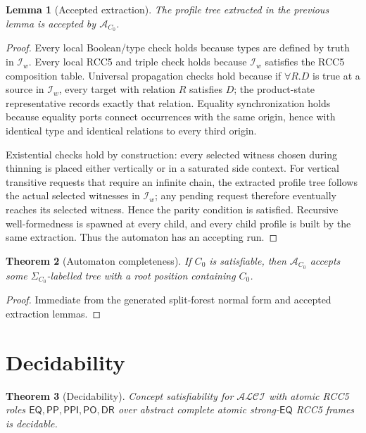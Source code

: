 \documentclass[11pt]{article}
\newtheorem{theorem}{Theorem}[section]
\newtheorem{lemma}[theorem]{Lemma}
\newcommand{\ALCI}{\mathcal{ALCI}}
\newcommand{\EQ}{\mathsf{EQ}}
\newcommand{\PP}{\mathsf{PP}}
\newcommand{\PPI}{\mathsf{PPI}}
\newcommand{\PO}{\mathsf{PO}}
\newcommand{\DR}{\mathsf{DR}}
\newcommand{\Aut}{\mathcal A}
\begin{document}
\begin{lemma}[Accepted extraction]
The profile tree extracted in the previous lemma is accepted by $\Aut_{C_0}$.
\end{lemma}

\begin{proof}
Every local Boolean/type check holds because types are defined by truth in $\mathcal I_w$.  Every local RCC5 and triple check holds because $\mathcal I_w$ satisfies the RCC5 composition table.  Universal propagation checks hold because if $\forall R.D$ is true at a source in $\mathcal I_w$, every target with relation $R$ satisfies $D$; the product-state representative records exactly that relation.  Equality synchronization holds because equality ports connect occurrences with the same origin, hence with identical type and identical relations to every third origin.

Existential checks hold by construction: every selected witness chosen during thinning is placed either vertically or in a saturated side context.  For vertical transitive requests that require an infinite chain, the extracted profile tree follows the actual selected witnesses in $\mathcal I_w$; any pending request therefore eventually reaches its selected witness.  Hence the parity condition is satisfied.  Recursive well-formedness is spawned at every child, and every child profile is built by the same extraction.  Thus the automaton has an accepting run.
\end{proof}

\begin{theorem}[Automaton completeness]
If $C_0$ is satisfiable, then $\Aut_{C_0}$ accepts some $\Sigma_{C_0}$-labelled tree with a root position containing $C_0$.
\end{theorem}

\begin{proof}
Immediate from the generated split-forest normal form and accepted extraction lemmas.
\end{proof}

\section{Decidability}

\begin{theorem}[Decidability]
Concept satisfiability for $\ALCI$ with atomic RCC5 roles $\EQ,\PP,\PPI,\PO,\DR$ over abstract complete atomic strong-$\EQ$ RCC5 frames is decidable.
\end{theorem}
\end{document}

